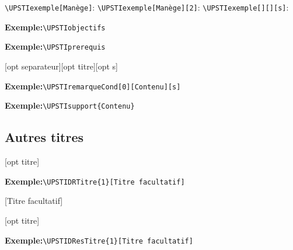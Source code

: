 \documentclass[11pt]{ltxdockit}[2010/09/26]
\newcommand{\ex}{\noindent \textbf{Exemple:}\quad}
\begin{document}
\noindent \verb!\UPSTIexemple[Manège]!: \UPSTIexemple[Manège] 
\noindent \verb!\UPSTIexemple[Manège][2]!: \UPSTIexemple[Manège][2] 
\noindent \verb!\UPSTIexemple[][][s]!: \UPSTIexemple[][][s]

\vspace{1em}
\begin{ltxsyntax}
\end{ltxsyntax}
\ex\verb!\UPSTIobjectifs!

\vspace{1em}
\UPSTIobjectifs

\vspace{1em}
\begin{ltxsyntax}
\end{ltxsyntax}
\ex\verb!\UPSTIprerequis!

\vspace{1em}
\UPSTIprerequis

\vspace{1em}
\begin{ltxsyntax}
[opt separateur][opt titre][opt s]
\end{ltxsyntax}
\ex\verb!\UPSTIremarqueCond[0][Contenu][s]!

\vspace{1em}
\UPSTIremarqueCond[0][Contenu][s]

\vspace{1em}
\begin{ltxsyntax}
\end{ltxsyntax}
\ex\verb!\UPSTIsupport{Contenu}!

\vspace{1em}

\subsection{Autres titres}
\begin{ltxsyntax}
[opt titre]
\end{ltxsyntax}
\ex\verb!\UPSTIDRTitre{1}[Titre facultatif]!

[Titre facultatif]

\vspace{1em}
\begin{ltxsyntax}
[opt titre]
\end{ltxsyntax}
\ex\verb!\UPSTIDResTitre{1}[Titre facultatif]!
\end{document}
